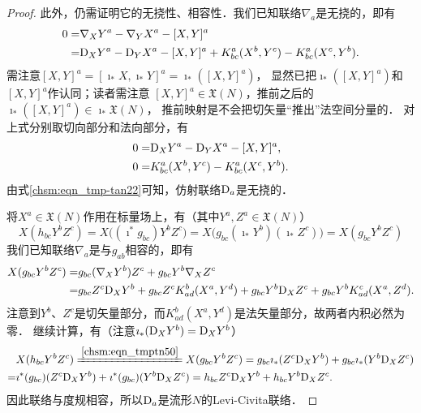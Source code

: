 \begin{proof}
    此外，仍需证明它的无挠性、相容性．我们已知联络${\nabla}_a$是无挠的，即有
    \begin{equation}
    \begin{aligned}
        0=&{\nabla}_{X} Y^a - {\nabla}_{Y} X^a -[{X}, {Y}]^a \\
         =&{\rm D}_{X} Y^a - {\rm D}_{Y} X^a -[X, Y]^a + K^a_{bc} (X^b ,Y^c) -K^a_{bc} (X^c, Y^b) .
    \end{aligned}
    \end{equation}
    需注意$[{X}, {Y}]^a=[\imath_*X, \imath_*Y]^a  =\imath_* ([X,Y]^a)$，
    显然已把$\imath_* ([X,Y]^a)$和$[X,Y]^a$作认同；读者需注意
    $[X,Y]^a\in \mathfrak{X}(N)$，推前之后的$\imath_* ([X,Y]^a)\in \imath_*\mathfrak{X}(N)$，
    推前映射是不会把切矢量“推出”法空间分量的．
    对上式分别取切向部分和法向部分，有
    \begin{align}
        0=& {\rm D}_{X} Y^a - {\rm D}_{Y} X^a -[X, Y]^a, \label{chsm:eqn_tmp-tan22} \\
        0=& K^a_{bc} (X^b, Y^c) -K^a_{bc} (X^c, Y^b). \label{chsm:eqn_tmp-nor22}
    \end{align}
    由式\eqref{chsm:eqn_tmp-tan22}可知，仿射联络${\rm D}_a$是无挠的．

    将$X^a\in \mathfrak{X}(N)$作用在标量场上，有（其中$Y^a,Z^a\in \mathfrak{X}(N)$）
    \begin{equation}\label{chsm:eqn_tmptn50}
         {X}({h}_{bc} {Y}^b {Z}^c) ={X}\bigl((\imath^*g_{bc}) {Y}^b {Z}^c \bigr)
         = {X}\bigl(g_{bc} (\imath_* {Y}^b) (\imath_*{Z}^c) \bigr)
         =X(g_{bc} Y^b Z^c)
    \end{equation}
    我们已知联络${\nabla}_a$是与${g}_{ab}$相容的，即有
    \begin{align*}
        {X}({g}_{bc} {Y}^b {Z}^c) =&  {g}_{bc} ({\nabla}_{X} {Y}^b ){Z}^c +{g}_{bc} {Y}^b {\nabla}_{X}{Z}^c \\
       =& {g}_{bc}{Z}^c {\rm D}_{X} Y^b  +{g}_{bc}{Z}^c  K^b_{ad} (X^a, Y^d)
         +{g}_{bc}{Y}^b {\rm D}_{X} Z^c  +{g}_{bc}{Y}^b  K^c_{ad} (X^a, Z^d) .
    \end{align*}
    注意到$Y^b$、${Z}^c$是切矢量部分，而$K^b_{ad} (X^a, Y^d)$是法矢量部分，故两者内积必然为零．
    继续计算，有（注意$\imath_*({\rm D}_{X} Y^b) ={\rm D}_{X} Y^b$）
    \begin{align*}
        &X(h_{bc} Y^b Z^c)\xlongequal{\ref{chsm:eqn_tmptn50}} {X}({g}_{bc} {Y}^b {Z}^c)=
        {g}_{bc}\imath_* ({Z}^c {\rm D}_{X} Y^b)  +{g}_{bc}\imath_*({Y}^b {\rm D}_{X} Z^c ) \\
        =&\imath^*({g}_{bc})({Z}^c {\rm D}_{X} Y^b)+\imath^*({g}_{bc})({Y}^b {\rm D}_{X} Z^c )
        = h_{bc}{Z}^c {\rm D}_{X} Y^b+ h_{bc} Y^b {\rm D}_{X} Z^c  .
    \end{align*}
    因此联络与度规相容，所以${\rm D}_a$是流形$N$的Levi-Civita联络．
\end{proof}


